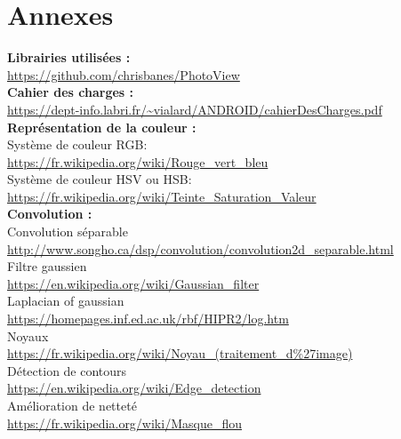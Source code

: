 \documentclass[12pt, a4paper]{article}
\begin{document}
\section{Annexes}

\textbf{Librairies utilisées :}
\\
\url{https://github.com/chrisbanes/PhotoView}
\\

\textbf{Cahier des charges :}
\\
\url{https://dept-info.labri.fr/~vialard/ANDROID/cahierDesCharges.pdf}
\\

\textbf{Représentation de la couleur :}
\\
Système de couleur RGB:
\\
\url{https://fr.wikipedia.org/wiki/Rouge_vert_bleu}
\\
Système de couleur HSV ou HSB:
\\
\url{https://fr.wikipedia.org/wiki/Teinte_Saturation_Valeur}
\\

\textbf{Convolution :}
\\
Convolution séparable \label{separable_source}
\\
\url{http://www.songho.ca/dsp/convolution/convolution2d_separable.html}
\\
Filtre gaussien \label{gauss_source}
\\
\url{https://en.wikipedia.org/wiki/Gaussian_filter}
\\
Laplacian of gaussian \label{LoG}
\\
\url{https://homepages.inf.ed.ac.uk/rbf/HIPR2/log.htm}
\\
Noyaux \label{kernel_source}
\\
\url{https://fr.wikipedia.org/wiki/Noyau_(traitement_d%27image)}
\\
Détection de contours \label{edge_source}
\\
\url{https://en.wikipedia.org/wiki/Edge_detection}
\\
Amélioration de netteté \label{sharpen_source}
\\
\url{https://fr.wikipedia.org/wiki/Masque_flou}
\\
\end{document}
